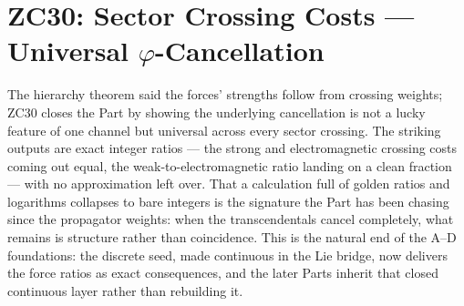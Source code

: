 \documentclass[12pt, a4paper]{article}
\begin{document}


\section{ZC30: Sector Crossing Costs --- Universal $\varphi$-Cancellation}
\label{sec:zc30-sector-crossing}

The hierarchy theorem said the forces' strengths follow from crossing weights;
ZC30 closes the Part by showing the underlying cancellation is not a lucky feature
of one channel but universal across every sector crossing. The striking outputs
are exact integer ratios --- the strong and electromagnetic crossing costs coming
out equal, the weak-to-electromagnetic ratio landing on a clean fraction --- with
no approximation left over. That a calculation full of golden ratios and
logarithms collapses to bare integers is the signature the Part has been chasing
since the propagator weights: when the transcendentals cancel completely, what
remains is structure rather than coincidence. This is the natural end of the A–D
foundations: the discrete seed, made continuous in the Lie bridge, now delivers
the force ratios as exact consequences, and the later Parts inherit that closed
continuous layer rather than rebuilding it.

\end{document}
